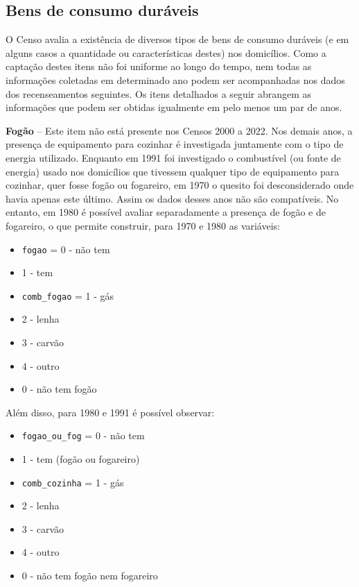 \documentclass[12pt,a4paper]{article}
\newcommand{\vr}[1]{\texttt{#1}}
\begin{document}
\subsection{Bens de consumo duráveis}\label{sec:c11}
O Censo avalia a existência de diversos tipos de bens de consumo duráveis (e em alguns casos a quantidade ou características destes) nos domicílios. Como a captação destes itens não foi uniforme ao longo do tempo, nem todas as informações coletadas em determinado ano podem ser acompanhadas nos dados dos recenseamentos seguintes. Os itens detalhados a seguir abrangem as informações que podem ser obtidas igualmente em pelo menos um par de anos.

\medskip
\textbf{Fogão} -- Este item não está presente nos Censos 2000 a 2022. Nos demais anos, a presença de equipamento para cozinhar é investigada juntamente com o tipo de energia utilizado. Enquanto em 1991 foi investigado o combustível (ou fonte de energia) usado nos domicílios que tivessem qualquer tipo de equipamento para cozinhar, quer fosse fogão ou fogareiro, em 1970 o quesito foi desconsiderado onde havia apenas este último. Assim os dados desses anos não são compatíveis. No entanto, em 1980 é possível avaliar separadamente a presença de fogão e de fogareiro, o que permite construir, para 1970 e 1980 as variáveis:
\begin{itemize}
  \item \vr{fogao} = 0 - não tem
  \item 1 - tem
  \item \vr{comb\_fogao} = 1 - gás
  \item 2 - lenha
  \item 3 - carvão
  \item 4 - outro
  \item 0 - não tem fogão
\end{itemize}

Além disso, para 1980 e 1991 é possível observar:
\begin{itemize}
  \item \vr{fogao\_ou\_fog} = 0 - não tem
  \item 1 - tem (fogão ou fogareiro)
  \item \vr{comb\_cozinha} = 1 - gás
  \item 2 - lenha
  \item 3 - carvão
  \item 4 - outro
  \item 0 - não tem fogão nem fogareiro
\end{itemize}
\end{document}
